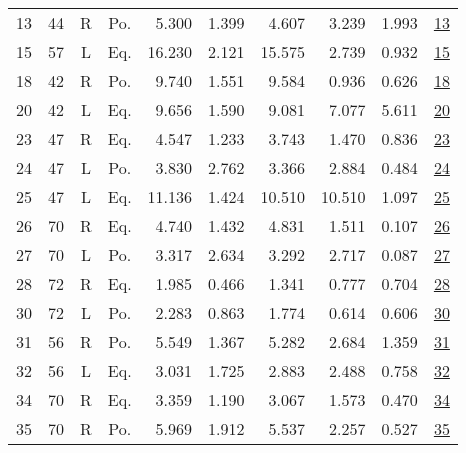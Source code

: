 \begin{table}[tbp]
\begin{tabular}{rrccrrrrrr}
    13 &   44 &   R &    Po. &       5.300 &       1.399 &       4.607 &       3.239 &       1.993 & \href{https://youtu.be/G4ekasqhbEY}{13} \\
    15 &   57 &   L &    Eq. &      16.230 &       2.121 &      15.575 &       2.739 &       0.932 & \href{https://youtu.be/7pJMKoXXRls}{15} \\
    18 &   42 &   R &    Po. &       9.740 &       1.551 &       9.584 &       0.936 &       0.626 & \href{https://youtu.be/0xqN4JKmKDg}{18} \\
    20 &   42 &   L &    Eq. &       9.656 &       1.590 &       9.081 &       7.077 &       5.611 & \href{https://youtu.be/GyRVZAg014U}{20} \\
    23 &   47 &   R &    Eq. &       4.547 &       1.233 &       3.743 &       1.470 &       0.836 & \href{https://youtu.be/BfQ6qyUiURo}{23} \\
    24 &   47 &   L &    Po. &       3.830 &       2.762 &       3.366 &       2.884 &       0.484 & \href{https://youtu.be/FWUjPhPPljg}{24} \\
    25 &   47 &   L &    Eq. &      11.136 &       1.424 &      10.510 &      10.510 &       1.097 & \href{https://youtu.be/WzmhzPpaXes}{25} \\
    26 &   70 &   R &    Eq. &       4.740 &       1.432 &       4.831 &       1.511 &       0.107 & \href{https://youtu.be/2eyR13wFwgc}{26} \\
    27 &   70 &   L &    Po. &       3.317 &       2.634 &       3.292 &       2.717 &       0.087 & \href{https://youtu.be/QtFtrJduzXI}{27} \\
    28 &   72 &   R &    Eq. &       1.985 &       0.466 &       1.341 &       0.777 &       0.704 & \href{https://youtu.be/EiUe4rJq00w}{28} \\
    30 &   72 &   L &    Po. &       2.283 &       0.863 &       1.774 &       0.614 &       0.606 & \href{https://youtu.be/lVc7KTdgHN8}{30} \\
    31 &   56 &   R &    Po. &       5.549 &       1.367 &       5.282 &       2.684 &       1.359 & \href{https://youtu.be/YhvRVT4y5_I}{31} \\
    32 &   56 &   L &    Eq. &       3.031 &       1.725 &       2.883 &       2.488 &       0.758 & \href{https://youtu.be/fUk3ysx-1lY}{32} \\
    34 &   70 &   R &    Eq. &       3.359 &       1.190 &       3.067 &       1.573 &       0.470 & \href{https://youtu.be/ftoBb1TNKII}{34} \\
    35 &   70 &   R &    Po. &       5.969 &       1.912 &       5.537 &       2.257 &       0.527 & \href{https://youtu.be/Nu9-23pe-X4}{35} \\

\end{tabular}
\end{table}
